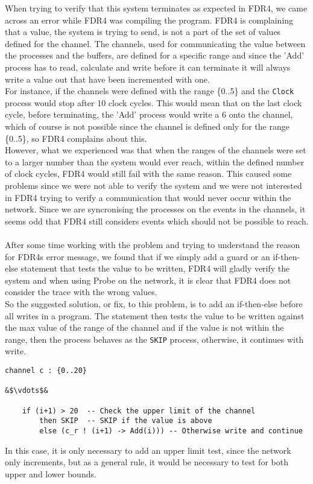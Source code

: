 When trying to verify that this system terminates as expected in FDR4, we came across an error while FDR4 was compiling the program.
FDR4 is complaining that a value, the system is trying to send, is not a part of the set of values defined for the channel.
The channels, used for communicating the value between the processes and the buffers, are defined for a specific range and since the 'Add' process has to read, calculate and write before it can terminate it will always write a value out that have been incremented with one.\\
For instance, if the channels were defined with the range \{0..5\} and the \texttt{Clock} process would stop after 10 clock cycles. This would mean that on the last clock cycle, before terminating, the 'Add' process would write a 6 onto the channel, which of course is not possible since the channel is defined only for the range \{0..5\}, so FDR4 complains about this.\\
However, what we experienced was that when the ranges of the channels were set to a larger number than the system would ever reach, within the defined number of clock cycles, FDR4 would still fail with the same reason.
This caused some problems since we were not able to verify the system and we were not interested in FDR4 trying to verify a communication that would never occur within the network.
Since we are syncronising the processes on the events in the channels, it seems odd that FDR4 still considers events which should not be possible to reach.  \\\\
After some time working with the problem and trying to understand the reason for FDR4s error message, we found that if we simply add a guard or an if-then-else statement that tests the value to be written, FDR4 will gladly verify the system and when using Probe on the network, it is clear that FDR4 does not consider the trace with the wrong values. \\

So the suggested solution, or fix, to this problem, is to add an if-then-else before all writes in a program. The statement then tests the value to be written against the max value of the range of the channel and if the value is not within the range, then the process behaves as the \texttt{SKIP} process, otherwise, it continues with write.
\begin{verbatim}
channel c : {0..20}

&$\vdots$&

    if (i+1) > 20  -- Check the upper limit of the channel
        then SKIP  -- SKIP if the value is above
        else (c_r ! (i+1) -> Add(i))) -- Otherwise write and continue
\end{verbatim}
In this case, it is only necessary to add an upper limit test, since the network only increments, but as a general rule, it would be necessary to test for both upper and lower bounds.


